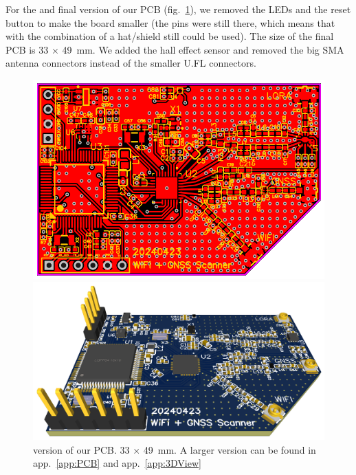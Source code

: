 For the  and final version of our \ac{PCB} (fig.~\ref{fig:pcb_v3}), we removed the \ac{LED}s and the reset button to make the board smaller (the pins were still there, which means that with the combination of a hat/shield still could be used). The size of the final \ac{PCB} is \si{33} $\times$ \SI{49}{\milli\meter}. We added the hall effect sensor and removed the big SMA antenna connectors instead of the smaller U.FL connectors.

\begin{figure}[H]
    \centering
    \begin{minipage}[c]{0.49\textwidth}
        \centering
        \includegraphics[width=\textwidth]{figures/PCB_v3.png}
    \end{minipage}
    \hfill
    \begin{minipage}[c]{0.49\textwidth}
        \centering
        \includegraphics[width=\textwidth]{figures/PCB_v3_3D.png}
    \end{minipage}
    \caption{ version of our PCB. \si{33} $\times$ \SI{49}{\milli\meter}. A larger version can be found in app.~\ref{app:PCB} and app.~\ref{app:3DView}}
    \label{fig:pcb_v3}
\end{figure}

